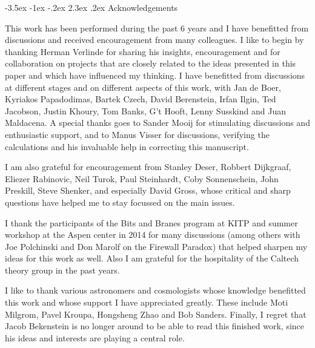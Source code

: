 \documentclass[a4paper,12pt]{article}
\makeatletter
\renewcommand\section{\@startsection {section}{1}{\z@}%
                                   {-3.5ex \@plus -1ex \@minus -.2ex}%
                                   {2.3ex \@plus.2ex}%
                                   {\normalfont\large\bfseries}}
\makeatother
\begin{document}





\newpage




\section{Acknowledgements}

This work has been performed during the past 6 years and I have benefitted from 
discussions and  received encouragement from many colleagues. I like to begin by thanking Herman Verlinde for sharing his insights, encouragement and
for collaboration on projects that are closely related to the ideas presented in this paper and 
which have influenced my thinking. I have benefitted from discussions at different stages  and 
on different aspects of this work,  with Jan de Boer, Kyriakos Papadodimas, Bartek Czech, David Berenstein,  Irfan Ilgin, Ted Jacobson, Justin Khoury, Tom Banks, G't Hooft,  Lenny Susskind and 
Juan Maldacena.  A special thanks goes to Sander Mooij for stimulating discussions and enthusiastic 
support, and to Manus Visser for discussions, verifying the calculations and his 
invaluable help in correcting this manuscript. 

I am also grateful for encouragement  from Stanley Deser, Robbert Dijkgraaf, Eliezer Rabinovic, 
Neil Turok, Paul Steinhardt, Coby Sonnenschein, John Preskill, Steve Shenker,  and especially 
David Gross, whose critical and sharp questions have helped me to stay focussed on the main
 issues.  

I  thank the participants of the Bits and Branes program at KITP and summer workshop at the 
Aspen center in 2014 for many discussions (among others with Joe Polchinski and Don Marolf 
on the Firewall Paradox) that helped sharpen my ideas for this work as well.  
Also  I am grateful for the hospitality of the Caltech theory group in the past years. 

I like to thank various astronomers and cosmologists whose knowledge  benefitted  this work and 
whose support I have appreciated greatly. These include   Moti Milgrom, Pavel Kroupa, Hongsheng Zhao and  Bob Sanders. Finally, I regret that Jacob Bekenstein is no longer around to be able to read this finished work, since his ideas and interests are playing a central role.  
\end{document}
